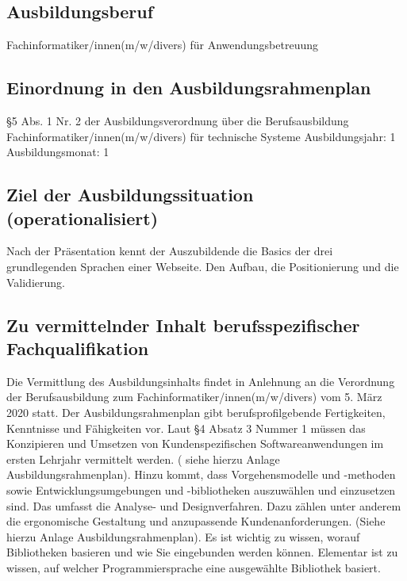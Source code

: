 \documentclass[a4paper, 12pt]{article}
\begin{document}
   \subsection{Ausbildungsberuf}
	Fachinformatiker/innen(m/w/divers) für Anwendungsbetreuung
	
	\subsection{Einordnung in den Ausbildungsrahmenplan}
	§5 Abs. 1 Nr. 2 der Ausbildungsverordnung über die Berufsausbildung Fachinformatiker/innen(m/w/divers) für technische Systeme
	\newline
	Ausbildungsjahr: 1\\
	Ausbildungsmonat: 1\\
     
    \subsection{Ziel der Ausbildungssituation (operationalisiert)}     
        Nach der Präsentation kennt der Auszubildende die Basics der drei grundlegenden Sprachen einer Webseite. Den Aufbau, die Positionierung und die Validierung.
   
    \subsection{Zu vermittelnder Inhalt berufsspezifischer Fachqualifikation}
    	Die Vermittlung des Ausbildungsinhalts findet in Anlehnung an die Verordnung der Berufsausbildung zum Fachinformatiker/innen(m/w/divers) vom 5. März 2020 statt. Der Ausbildungsrahmenplan gibt berufsprofilgebende Fertigkeiten, Kenntnisse und Fähigkeiten vor. Laut §4 Absatz 3 Nummer 1 müssen das Konzipieren und Umsetzen von Kundenspezifischen Softwareanwendungen im ersten Lehrjahr vermittelt werden. ( siehe hierzu Anlage Ausbildungsrahmenplan). Hinzu kommt, dass Vorgehensmodelle und -methoden sowie Entwicklungsumgebungen und -bibliotheken auszuwählen und einzusetzen sind. Das umfasst die Analyse- und Designverfahren. Dazu zählen unter anderem die ergonomische Gestaltung und anzupassende Kundenanforderungen. (Siehe hierzu Anlage Ausbildungsrahmenplan). Es ist wichtig zu wissen, worauf Bibliotheken basieren und wie Sie eingebunden werden können. Elementar ist zu wissen, auf welcher Programmiersprache eine ausgewählte Bibliothek basiert. 
   	
\end{document}
